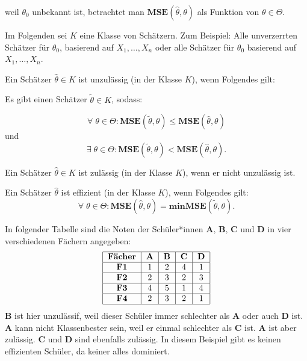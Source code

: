 \documentclass[10pt]{article}
\newcommand{\FZV}{X_1, \ldots, X_n} %
\newcommand{\MSE}{\textbf{MSE}} %
\newenvironment{BSP}[1][]
{\begin{Beispiel}[frametitle=#1]}{\end{Beispiel}}
\begin{document}
	weil $\theta_0$ unbekannt ist, betrachtet man $\MSE(\hat{\theta}, \theta)$ als Funktion von $\theta \in \Theta$.
	
	Im Folgenden sei $K$ eine Klasse von Schätzern. Zum Beispiel: Alle unverzerrten Schätzer für $\theta_0$, basierend auf $\FZV$ oder alle Schätzer für $\theta_0$ basierend auf $\FZV$. 
	
	\begin{Definition}
		Ein Schätzer $\hat{\theta} \in K$ ist unzulässig (in der Klasse $K$), wenn Folgendes gilt:
		
		Es gibt einen Schätzer $\tilde{\theta} \in K$, sodass:
		
		\begin{equation*}
			\forall \; \theta \in \Theta: \MSE(\tilde{\theta}, \theta) \leq \MSE(\hat{\theta}, \theta)
		\end{equation*}
		und 
		\begin{equation*}
			\exists \; \theta \in \Theta: \MSE(\tilde{\theta}, \theta) < \MSE(\hat{\theta},\theta).
		\end{equation*}
		
		Ein Schätzer $\hat{\theta} \in K$ ist zulässig (in der Klasse $K$), wenn er nicht unzulässig ist. 
	\end{Definition}
	
	\begin{Definition}
		Ein Schätzer $\hat{\theta}$ ist effizient (in der Klasse $K$), wenn Folgendes gilt:
		\begin{equation*}
			\forall \; \theta \in \Theta: \MSE(\hat{\theta}, \theta) = \textbf{min} \MSE(\tilde{\theta},\theta). 
		\end{equation*}
	\end{Definition}
	\begin{BSP}[Beispiel 1.4.1 (Noten Effizienz und Zulässigkeit)]
		In folgender Tabelle sind die Noten der Schüler*innen $\textbf{A, B, C}$ und $\textbf{D}$ in vier verschiedenen Fächern angegeben:
		\begin{align*}
				\begin{tabular}{|c|c|c|c|c|c|}
				\hline
				\textbf{Fächer} & \textbf{A} & \textbf{B} & \textbf{C} & \textbf{D}\\
				\hline
				\textbf{F1} & 1 & 2 & 4 & 1\\
				\hline
				\textbf{F2} & 2 & 3 & 2 & 3\\
				\hline
				\textbf{F3} & 4 & 5 & 1 & 4\\
				\hline
				\textbf{F4} & 2 & 3 & 2 & 1\\
				\hline
			\end{tabular}
		\end{align*}
		$\textbf{B}$ ist hier unzulässif, weil dieser Schüler immer schlechter als $\textbf{A}$ oder auch $\textbf{D}$ ist. 
		$\textbf{A}$ kann nicht Klassenbester sein, weil er einmal schlechter als $\textbf{C}$ ist. $\textbf{A}$ ist aber zulässig. $\textbf{C}$ und $\textbf{D}$ sind ebenfalls zulässig. In diesem Beispiel gibt es keinen effizienten Schüler, da keiner alles dominiert.
	\end{BSP}
	
\end{document}

